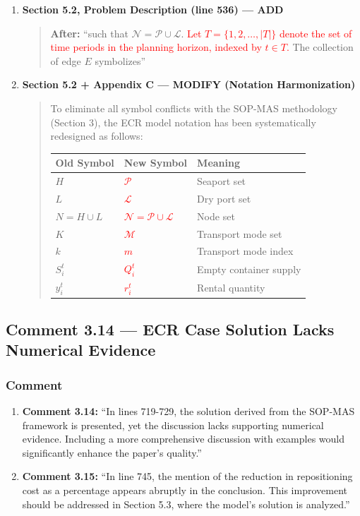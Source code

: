 \documentclass[11pt,a4paper]{article}
\begin{document}
\begin{enumerate}
\item \textbf{Section 5.2, Problem Description (line 536) --- ADD}
\begin{quote}
\textbf{After:} ``such that $\mathcal{N}=\mathcal{P}\cup\mathcal{L}$. \textcolor{red}{Let $T=\{1,2,\ldots,|T|\}$ denote the set of time periods in the planning horizon, indexed by $t \in T$.} The collection of edge $E$ symbolizes''
\end{quote}

\item \textbf{Section 5.2 + Appendix C --- MODIFY (Notation Harmonization)}
\begin{quote}
To eliminate all symbol conflicts with the SOP-MAS methodology (Section 3), the ECR model notation has been systematically redesigned as follows:

\begin{tabular}{lll}
\toprule
\textbf{Old Symbol} & \textbf{New Symbol} & \textbf{Meaning} \\
\midrule
$H$ & \textcolor{red}{$\mathcal{P}$} & Seaport set \\
$L$ & \textcolor{red}{$\mathcal{L}$} & Dry port set \\
$N=H\cup L$ & \textcolor{red}{$\mathcal{N}=\mathcal{P}\cup\mathcal{L}$} & Node set \\
$K$ & \textcolor{red}{$\mathcal{M}$} & Transport mode set \\
$k$ & \textcolor{red}{$m$} & Transport mode index \\
$S_i^t$ & \textcolor{red}{$Q_i^t$} & Empty container supply \\
$y_i^t$ & \textcolor{red}{$r_i^t$} & Rental quantity \\
\bottomrule
\end{tabular}
\end{quote}
\end{enumerate}

\subsection{Comment 3.14 --- ECR Case Solution Lacks Numerical Evidence}

\subsubsection{Comment}
\begin{enumerate}
\item \textbf{Comment 3.14: }``In lines 719-729, the solution derived from the SOP-MAS framework is presented, yet the discussion lacks supporting numerical evidence. Including a more comprehensive discussion with examples would significantly enhance the paper's quality.''

\item \textbf{Comment 3.15: }``In line 745, the mention of the reduction in repositioning cost as a percentage appears abruptly in the conclusion. This improvement should be addressed in Section 5.3, where the model's solution is analyzed.''
\end{enumerate}
\end{document}
